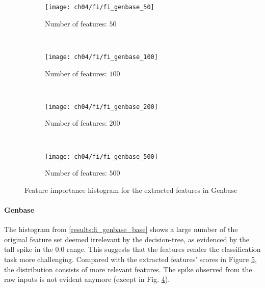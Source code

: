 \begin{figure}[t]
    \centering
    \begin{subfigure}[b]{0.45\textwidth}
        \texttt{[image: ch04/fi/fi\_genbase\_50]}
        \caption{Number of features: $50$}
        \label{results:fi_genbase_50}
    \end{subfigure}
    ~ %
    \begin{subfigure}[b]{0.45\textwidth}
        \texttt{[image: ch04/fi/fi\_genbase\_100]}
        \caption{Number of features: $100$}
        \label{results:fi_genbase_100}
    \end{subfigure}
    ~ %
    \begin{subfigure}[b]{0.45\textwidth}
        \texttt{[image: ch04/fi/fi\_genbase\_200]}
        \caption{Number of features: $200$}
        \label{results:fi_genbase_200}
    \end{subfigure}
    ~ %
    \begin{subfigure}[b]{0.45\textwidth}
        \texttt{[image: ch04/fi/fi\_genbase\_500]}
        \caption{Number of features: $500$}
        \label{results:fi_genbase_500}
    \end{subfigure}
    \caption{Feature importance histogram for the extracted features in Genbase}
    \label{results:fi_genbase}
\end{figure}

\paragraph{Genbase} The histogram from \ref{results:fi_genbase_base} shows a
large number of the original feature set deemed irrelevant by the
decision-tree, as evidenced by the tall spike in the $0.0$ range. This suggests
that the features render the classification task more challenging. Compared
with the extracted features' scores in Figure \ref{results:fi_genbase}, the
distribution consists of more relevant features. The spike observed from the
raw inputs is not evident anymore (except in Fig.
\ref{results:fi_genbase_500}).\\

